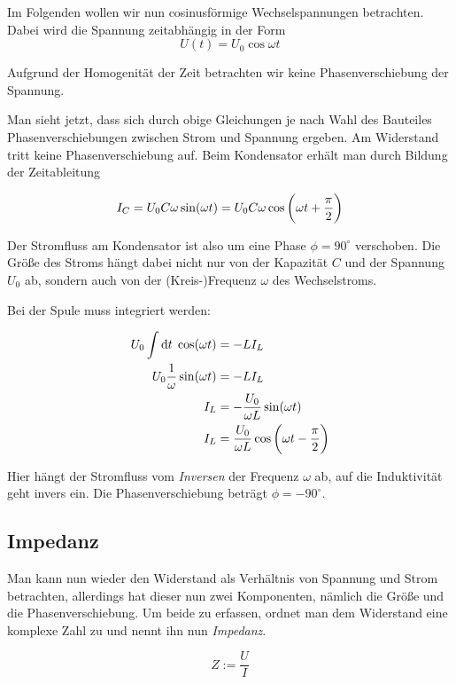 \documentclass[a4paper,german,12pt,smallheadings]{scrartcl}
\begin{document}
Im Folgenden wollen wir nun cosinusförmige Wechselspannungen betrachten. Dabei
wird die Spannung zeitabhängig in der Form
\begin{equation}
  U(t) = U_0 \cos \omega t
\end{equation}

Aufgrund der Homogenität der Zeit betrachten wir keine Phasenverschiebung der
Spannung.

Man sieht jetzt, dass sich durch obige Gleichungen je nach Wahl des Bauteiles
Phasenverschiebungen zwischen Strom und Spannung ergeben. Am Widerstand tritt
keine Phasenverschiebung auf. Beim Kondensator erhält man durch Bildung der
Zeitableitung

\begin{equation}
  I_C = U_0 C \omega \sin(\omega t) = U_0 C \omega \cos \del{\omega t + \frac{\pi}{2}}
\end{equation}

Der Stromfluss am Kondensator ist also um eine Phase $\phi = 90^\circ$
verschoben. Die Größe des Stroms hängt dabei nicht nur von der Kapazität $C$
und der Spannung $U_0$ ab, sondern auch von der (Kreis-)Frequenz $\omega$ des
Wechselstroms.

Bei der Spule muss integriert werden:

\begin{align}
  U_0 \int \dif t \; \cos(\omega t) &= -L I_L \\
  U_0 \frac{1}{\omega} \sin(\omega t) &= -L I_L \\
  I_L &= -\frac{U_0}{\omega L} \sin(\omega t) \\
  I_L &= \frac{U_0}{\omega L} \cos \del{\omega t - \frac{\pi}{2}}
\end{align}

Hier hängt der Stromfluss vom \textit{Inversen} der Frequenz $\omega$ ab, auf
die Induktivität geht invers ein. Die Phasenverschiebung beträgt $\phi =
-90^\circ$.

\subsection{Impedanz}

Man kann nun wieder den Widerstand als Verhältnis von Spannung und Strom
betrachten, allerdings hat dieser nun zwei Komponenten, nämlich die Größe und
die Phasenverschiebung. Um beide zu erfassen, ordnet man dem Widerstand eine
komplexe Zahl zu und nennt ihn nun \textit{Impedanz}.

\begin{equation}
  Z := \frac{U}{I}
\end{equation}
\end{document}
